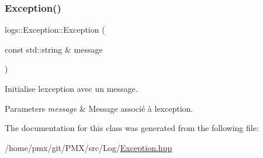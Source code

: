 \subsubsection{\texorpdfstring{Exception()}{Exception()}}
{\footnotesize\ttfamily logs\+::\+Exception\+::\+Exception (\begin{DoxyParamCaption}\item[{const std\+::string \&}]{message }\end{DoxyParamCaption})\hspace{0.3cm}{\ttfamily [inline]}}



Initialise l\textquotesingle{}exception avec un message. 


\begin{DoxyParams}{Parameters}
{\em message} & Message associé à l\textquotesingle{}exception. \\
\hline
\end{DoxyParams}


The documentation for this class was generated from the following file\+:\begin{DoxyCompactItemize}
\item 
/home/pmx/git/\+P\+M\+X/src/\+Log/\hyperlink{Exception_8hpp}{Exception.\+hpp}\end{DoxyCompactItemize}
